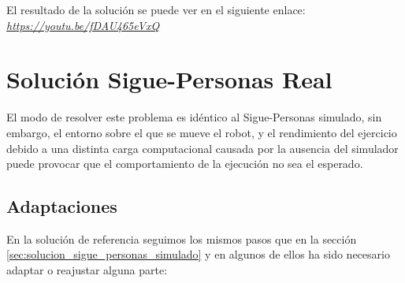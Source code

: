 El resultado de la solución se puede ver en el siguiente enlace:\\
\textit{\url{https://youtu.be/fDAU465eVxQ}}\\




\section{Solución Sigue-Personas Real}
\label{sec:solucion_sigue_personas_real}

El modo de resolver este problema es idéntico al Sigue-Personas simulado, sin embargo, el entorno sobre el que se mueve el robot, y el rendimiento del ejercicio debido a una distinta carga computacional causada por la ausencia del simulador puede provocar que el comportamiento de la ejecución no sea el esperado.\\

\subsection{Adaptaciones}
\label{subsec:adaptaciones}

En la solución de referencia seguimos los mismos pasos que en la sección \ref{sec:solucion_sigue_personas_simulado} y en algunos de ellos ha sido necesario adaptar o reajustar alguna parte:\\

